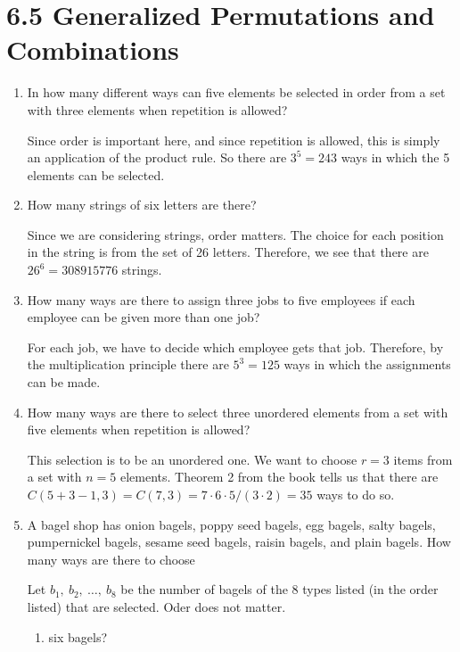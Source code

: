 \documentclass[11pt]{article}
\begin{document}
\section*{\textbf{6.5 Generalized Permutations and Combinations}}
\begin{enumerate}[label=\textbf{\arabic*.}]
	\item In how many different ways can five elements be selected in order from a set with three elements when repetition is allowed?
	
	Since order is important here, and since repetition is allowed, this is simply an application of the product rule. So there are $3^5 = 243$ ways in which the 5 elements can be selected.
	
	\item How many strings of six letters are there?
	
	Since we are considering strings, order matters. The choice for each position in the string is from the set of 26 letters. Therefore, we see that there are $26^6 = 308915776$ strings.
	
	\item How many ways are there to assign three jobs to five employees if each employee can be given more than one job?
	
	For each job, we have to decide which employee gets that job. Therefore, by the multiplication principle there are $5^3 = 125$ ways in which the assignments can be made.
	
	\item How many ways are there to select three unordered elements from a set with five elements when repetition is allowed?
	
	This selection is to be an unordered one. We want to choose $r = 3$ items from a set with $n = 5$ elements. Theorem 2 from the book tells us that there are $C(5 + 3 - 1, 3) = C(7, 3) = 7 \cdot 6 \cdot 5 / (3 \cdot 2) = 35$ ways to do so.
	
	\item A bagel shop has onion bagels, poppy seed bagels, egg bagels, salty bagels, pumpernickel bagels, sesame seed bagels, raisin bagels, and plain bagels. How many ways are there to choose
	
	Let $b_1,\ b_2,\ \ldots,\ b_8$ be the number of bagels of the 8 types listed (in the order listed) that are selected. Oder does not matter.
	
	\begin{enumerate}[label=\textbf{\alph*)}]
		\item six bagels?
		

\end{enumerate}
\end{enumerate}
\end{document}
